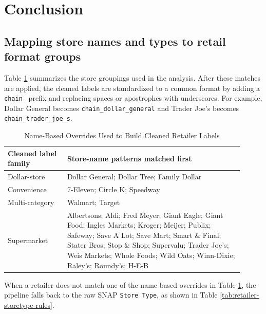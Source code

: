 \documentclass[12pt]{article}
\begin{document}
\section{Conclusion}


\begin{appendices}
\renewcommand{\thetable}{A\arabic{table}}
\renewcommand{\thefigure}{A\arabic{table}}
\setcounter{table}{0}


\section{Mapping store names and types to retail format groups} \label{app:retail_groups}

Table \ref{tab:retailer-name-rules} summarizes the store groupings used in the analysis. After these matches are applied, the cleaned labels are standardized to a common format by adding a \texttt{chain\_} prefix and replacing spaces or apostrophes with underscores. For example, Dollar General becomes \texttt{chain\_dollar\_general} and Trader Joe's becomes \texttt{chain\_trader\_joe\_s}.


\begin{table}[!htbp]
\centering
\caption{Name-Based Overrides Used to Build Cleaned Retailer Labels}
\label{tab:retailer-name-rules}
\small
\begin{tabular}{p{0.23\linewidth}p{0.68\linewidth}}
\hline
Cleaned label family & Store-name patterns matched first \\
\hline
Dollar-store & Dollar General; Dollar Tree; Family Dollar \\
Convenience & 7-Eleven; Circle K; Speedway \\
Multi-category & Walmart; Target \\
Supermarket & Albertsons; Aldi; Fred Meyer; Giant Eagle; Giant Food; Ingles Markets; Kroger; Meijer; Publix; Safeway; Save A Lot; Save Mart; Smart \& Final; Stater Bros; Stop \& Shop; Supervalu; Trader Joe's; Weis Markets; Whole Foods; Wild Oats; Winn-Dixie; Raley's; Roundy's; H-E-B \\
\hline
\end{tabular}
\end{table}

When a retailer does not match one of the name-based overrides in Table \ref{tab:retailer-name-rules}, the pipeline falls back to the raw SNAP \texttt{Store Type}, as shown in Table \ref{tab:retailer-storetype-rules}.


\end{appendices}
\end{document}
